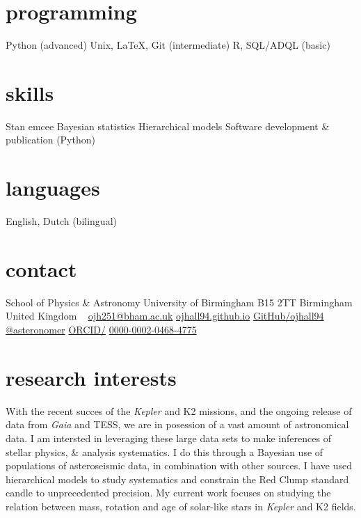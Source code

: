 \documentclass[]{k-cv} %
\begin{document}


\begin{aside} %
\section{programming}
Python (advanced)
Unix, LaTeX, Git (intermediate)
R, SQL/ADQL (basic)
\section{skills}
Stan
emcee
Bayesian statistics
Hierarchical models
Software development \& publication (Python)
\section{languages}
English, Dutch (bilingual)
\section{contact}
School of Physics \& Astronomy
University of Birmingham
B15 2TT
Birmingham
United Kingdom
~
\href{mailto:ojh251@student.bham.ac.uk}{ojh251@bham.ac.uk}
\href{http://www.ojhall94.github.io}{ojhall94.github.io}
\href{http://www.github.com/ojhall94}{GitHub/ojhall94}
\href{http://www.twitter.com/asteronomer}{@asteronomer}
\href{http://www.orcid.com/0000-0002-0468-4775}{ORCID/}
\href{http://www.orcid.com/0000-0002-0468-4775}{0000-0002-0468-4775}
\end{aside}

\section{research interests}
\bodyfont With the recent succes of the \textit{Kepler} and K2 missions, and the ongoing release of data from \textit{Gaia} and TESS, we are in posession of a vast amount of astronomical data. I am intersted in leveraging these large data sets to make inferences of stellar physics, \& analysis systematics. I do this through a Bayesian use of populations of asteroseismic data, in combination with other sources. I have used hierarchical models to study systematics and constrain the Red Clump standard candle to unprecedented precision. My current work focuses on studying the relation between mass, rotation and age of solar-like stars in \textit{Kepler} and K2 fields.
\end{document}
